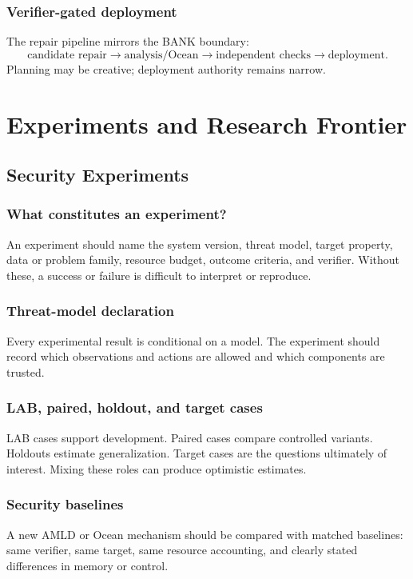 \documentclass[11pt,oneside]{book}
\theoremstyle{definition}
\theoremstyle{remark}
\begin{document}
\section{Verifier-gated deployment}
The repair pipeline mirrors the BANK boundary:
\[
\text{candidate repair}\rightarrow\text{analysis/Ocean}\rightarrow\text{independent checks}\rightarrow\text{deployment}.
\]
Planning may be creative; deployment authority remains narrow.

\part{Experiments and Research Frontier}

\chapter{Security Experiments}
\label{ch:experiments}
\section{What constitutes an experiment?}
An experiment should name the system version, threat model, target property, data or problem family, resource budget, outcome criteria, and verifier. Without these, a success or failure is difficult to interpret or reproduce.

\section{Threat-model declaration}
Every experimental result is conditional on a model. The experiment should record which observations and actions are allowed and which components are trusted.

\section{LAB, paired, holdout, and target cases}
LAB cases support development. Paired cases compare controlled variants. Holdouts estimate generalization. Target cases are the questions ultimately of interest. Mixing these roles can produce optimistic estimates.

\section{Security baselines}
A new AMLD or Ocean mechanism should be compared with matched baselines: same verifier, same target, same resource accounting, and clearly stated differences in memory or control.
\end{document}
